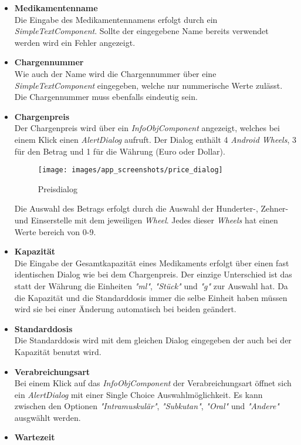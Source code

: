 \begin{itemize}
\item{\textbf{Medikamentenname}} \\
Die Eingabe des Medikamentennamens erfolgt durch ein \textit{SimpleTextComponent}. Sollte der eingegebene Name bereits verwendet werden wird ein Fehler angezeigt.
\item{\textbf{Chargennummer}} \\
Wie auch der Name wird die Chargennummer über eine \textit{SimpleTextComponent} eingegeben, welche nur nummerische Werte zulässt. Die Chargennummer muss ebenfalls eindeutig sein.
\item{\textbf{Chargenpreis}} \\
Der Chargenpreis wird über ein \textit{InfoObjComponent} angezeigt, welches bei einem Klick einen \textit{AlertDialog} aufruft. Der Dialog enthält 4 \textit{Android Wheels}, 3 für den Betrag und 1 für die Währung (Euro oder Dollar). 
\begin{figure}[H]
  \centering
  \texttt{[image: images/app\_screenshots/price\_dialog]} 
  \caption{Preisdialog}
\end{figure}
Die Auswahl des Betrags erfolgt durch die Auswahl der Hunderter-, Zehner- und Einserstelle mit dem jeweiligen \textit{Wheel}. Jedes dieser \textit{Wheels} hat einen Werte bereich von 0-9. 
\item{\textbf{Kapazität}} \\
Die Eingabe der Gesamtkapazität eines Medikaments erfolgt über einen fast identischen Dialog wie bei dem Chargenpreis. Der einzige Unterschied ist das statt der Währung die Einheiten \textit{"ml"}, \textit{"Stück"} und \textit{"g"} zur Auswahl hat. Da die Kapazität und die Standarddosis immer die selbe Einheit haben müssen wird sie bei einer Änderung automatisch bei beiden geändert. 
\item{\textbf{Standarddosis}} \\
Die Standarddosis wird mit dem gleichen Dialog eingegeben der auch bei der Kapazität benutzt wird.
\item{\textbf{Verabreichungsart}} \\
Bei einem Klick auf das \textit{InfoObjComponent} der Verabreichungsart öffnet sich ein \textit{AlertDialog} mit einer Single Choice Auswahlmöglichkeit. Es kann zwischen den Optionen \textit{"Intramuskulär"},  \textit{"Subkutan"},  \textit{"Oral"} und  \textit{"Andere"} ausgwählt werden.
\item{\textbf{Wartezeit}} \\

\end{itemize}
